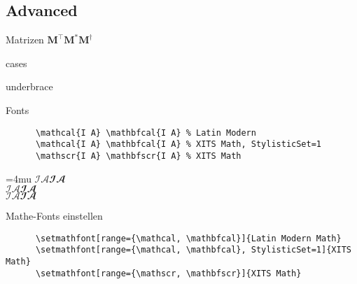 \subsection{Advanced}

\begin{frame}{Matrizen}
  $\mathbf{M}^\top \mathbf{M}^* \mathbf{M}^\dagger$
\end{frame}

\begin{frame}{cases}
\end{frame}

\begin{frame}{underbrace}
\end{frame}

\begin{frame}[fragile]{Fonts}
  \begin{CodeExample}{0.83}
    \begin{lstlisting}
      \mathcal{I A} \mathbfcal{I A} % Latin Modern
      \mathcal{I A} \mathbfcal{I A} % XITS Math, StylisticSet=1
      \mathscr{I A} \mathbfscr{I A} % XITS Math
    \end{lstlisting}
  \CodeResult
    \Umathordordspacing\textstyle=4mu
    $\mathcal{I A} \mathbfcal{I A}$ \\
    { $\mathcal{I A} \mathbfcal{I A}$} \\
    $\mathscr{I A} \mathbfscr{I A}$
  \end{CodeExample}

  \begin{block}{Mathe-Fonts einstellen}
    \begin{lstlisting}
      \setmathfont[range={\mathcal, \mathbfcal}]{Latin Modern Math}
      \setmathfont[range={\mathcal, \mathbfcal}, StylisticSet=1]{XITS Math}
      \setmathfont[range={\mathscr, \mathbfscr}]{XITS Math}
    \end{lstlisting}
  \end{block}
\end{frame}
